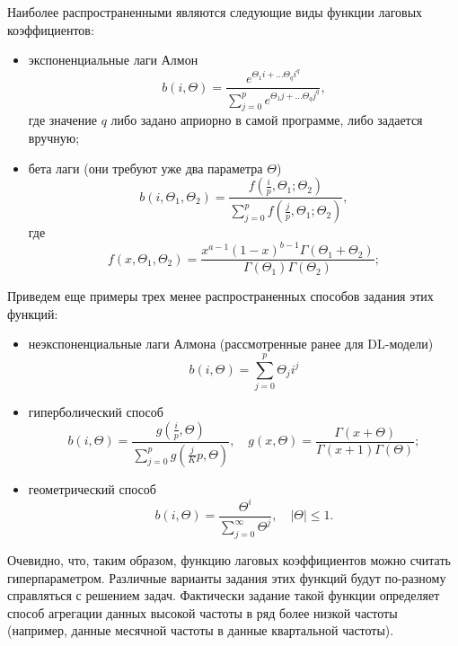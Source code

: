 \documentclass[a4paper, 12pt]{extarticle}
\numberwithin{equation}{subsection}
\renewcommand{\leq}{\leqslant}
\begin{document}
	Наиболее распространенными являются следующие виды функции лаговых коэффициентов:
	\begin{itemize}
		\item экспоненциальные лаги Алмон
		\begin{equation}
			b(i, \Theta) = \dfrac{e^{\Theta_1 i + \ldots \Theta_q i^q}}{\sum\limits_{j=0}^{p}e^{\Theta_1 j + \ldots \Theta_q j^q}},
		\end{equation}
		где значение $q$ либо задано априорно в самой программе, либо задается вручную;
		\item бета лаги (они требуют уже два параметра $\Theta$)
		\begin{equation}
			b(i, \Theta_1, \Theta_2) = \dfrac{f(\frac i p, \Theta_1;\Theta_2)}{\sum\limits_{j=0}^{p}f(\frac j p, \Theta_1;\Theta_2)},
		\end{equation}
		где 
		\begin{equation}
			f(x, \Theta_1, \Theta_2) = \dfrac{x^{a-1}(1-x)^{b-1}\Gamma(\Theta_1 + \Theta_2)}{\Gamma(\Theta_1)\Gamma(\Theta_2)};
		\end{equation}
	\end{itemize}
	Приведем еще примеры трех менее распространенных способов задания этих функций:
	\begin{itemize}
		\item неэкспоненциальные лаги Алмона (рассмотренные ранее для DL-модели)
		\begin{equation}
			b(i, \Theta) = \sum_{j=0}^{p}\Theta_j i^j
		\end{equation}
		\item гиперболический способ
		\begin{equation}
			b(i, \Theta) = \dfrac{g(\frac i p, \Theta)}{\sum_{j=0}^{p} g(\frac j Kp, \Theta)},\quad g(x, \Theta) = \dfrac{\Gamma(x + \Theta)}{\Gamma(x+1)\Gamma(\Theta)};
		\end{equation}
		\item геометрический способ
		\begin{equation}
			b(i, \Theta) = \dfrac{\Theta^i}{\sum_{j=0}^{\infty}\Theta^j},\quad |\Theta| \leq 1.
		\end{equation}
	\end{itemize}
	Очевидно, что, таким образом, функцию лаговых коэффициентов можно считать гиперпараметром. Различные варианты задания этих функций будут по-разному справляться с решением задач. Фактически задание такой функции определяет способ агрегации данных высокой частоты в ряд более низкой частоты (например, данные месячной частоты в данные квартальной частоты).
	
\end{document}
